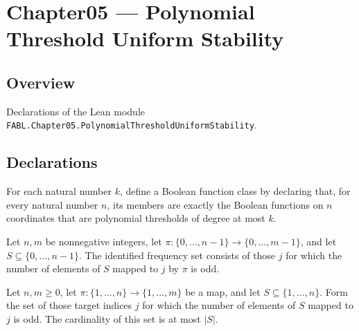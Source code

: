 \chapter{Chapter05 — Polynomial Threshold Uniform Stability}
\section{Overview}

Declarations of the Lean module \texttt{FABL.Chapter05.PolynomialThresholdUniformStability}.

\section{Declarations}

\begin{definition}
\label{FABL.polynomialThresholdClass}
\leanok
{}
For each natural number $k$, define a Boolean function class by declaring that, for
every natural number $n$, its members are exactly the Boolean functions on $n$
coordinates that are polynomial thresholds of degree at most $k$.
\end{definition}

\begin{definition}
\label{FABL.identifiedFrequency}
\leanok
Let $n,m$ be nonnegative integers, let $\pi:\{0,\ldots,n-1\}\to\{0,\ldots,m-1\}$, and
let $S\subseteq\{0,\ldots,n-1\}$. The identified frequency set consists of those $j$ for
which the number of elements of $S$ mapped to $j$ by $\pi$ is odd.
\end{definition}

\begin{theorem}
\label{FABL.identifiedFrequency_card_le}
\leanok
{}
Let $n,m\ge0$, let $\pi\colon\{1,\ldots,n\}\to\{1,\ldots,m\}$ be a map, and let
$S\subseteq\{1,\ldots,n\}$. Form the set of those target indices $j$ for which the
number of elements of $S$ mapped to $j$ is odd. The cardinality of this set is at most
$|S|$.
\end{theorem}

